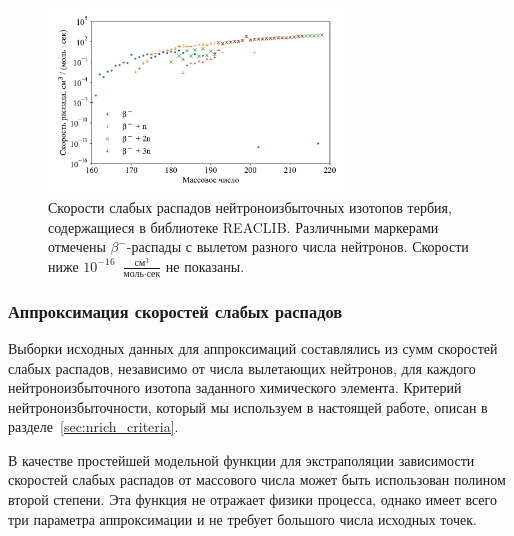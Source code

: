 \begin{figure}
  \centering
  \includegraphics[width=0.7\textwidth]{pics/decays_tb.pdf}
  \caption{Скорости слабых распадов нейтроноизбыточных изотопов тербия, содержащиеся в библиотеке REACLIB. Различными маркерами отмечены $\beta^-$-распады с вылетом разного числа нейтронов. Скорости ниже $10^{-16}$~$\frac{\text{см}^3}{\text{моль}\cdot\text{сек}}$ не показаны.}
  \label{img:decays_tb}
\end{figure}

\subsubsection{Аппроксимация скоростей слабых распадов}
  Выборки исходных данных для аппроксимаций составлялись из сумм скоростей слабых распадов, независимо от числа вылетающих нейтронов, для каждого нейтроноизбыточного изотопа заданного химического элемента. Критерий нейтроноизбыточности, который мы используем в настоящей работе, описан в разделе~\ref{sec:nrich_criteria}.
  
  В качестве простейшей модельной функции для экстраполяции зависимости скоростей слабых распадов от массового числа может быть использован полином второй степени. Эта функция не отражает физики процесса, однако имеет всего три параметра аппроксимации и не требует большого числа исходных точек. 

